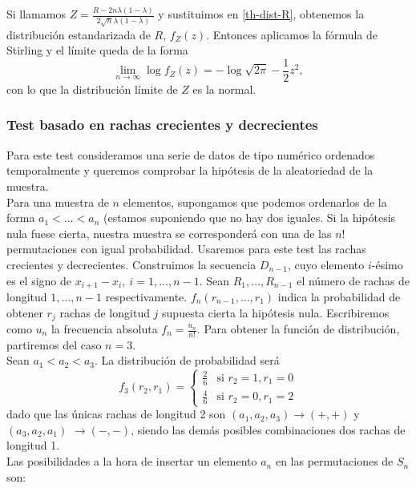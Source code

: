 	Si llamamos $Z = \frac{R - 2n\lambda (1-\lambda)}
{2 \sqrt{n}\lambda (1-\lambda)}$ y sustituimos en 
\ref{th-dist-R}, obtenemos la distribución estandarizada de 
$R$, $f_Z(z)$. Entonces aplicamos la fórmula de Stirling y el 
límite queda de la forma
	\[ \underset{n \rightarrow \infty}{\lim} \log f_Z(z)=
			-\log \sqrt{2\pi} - \frac{1}{2} z^2,	\]
	con lo que la distribución límite de $Z$ es la normal. 
	
	
\subsubsection{Test basado en rachas crecientes y decrecientes}	

	Para este test consideramos una serie de datos de tipo 
numérico ordenados temporalmente y queremos comprobar la 
hipótesis de la aleatoriedad de la muestra.\\
	Para una muestra de $n$ elementos, supongamos que podemos 
ordenarlos de la forma $a_1 < \dots < a_n$ (estamos 
suponiendo que no hay dos iguales. Si la hipótesis nula fuese 
cierta, nuestra muestra se corresponderá con una de las $n!$ 
permutaciones con igual probabilidad. Usaremos para este test 
las rachas crecientes y decrecientes. Construimos la 
secuencia $D_{n-1}$, cuyo elemento $i$-ésimo es el signo de 
$x_{i+1} - x_i,\ i=1, \dots, n-1$. Sean $R_1, \dots, R_{n-1}$ 
el número de rachas de longitud $1, \dots, n-1$ 
respectivamente. $f_n(r_{n-1}, \dots, r_1)$ indica la 
probabilidad de obtener $r_j$ rachas de longitud $j$ supuesta 
cierta la hipótesis nula. Escribiremos como $u_n$ la 
frecuencia absoluta $f_n = \frac{u_n}{n!}$. Para obtener la 
función de distribución, partiremos del caso $n=3$.\\
	Sean $a_1 < a_2 < a_3$. La distribución de probabilidad 
será 
	\[ 
	f_3(r_2, r_1) = 
		\left\lbrace\begin{array}{cc}
			\frac{2}{6} & \text{si } r_2 = 1, r_1 = 0 \\
			\frac{4}{6} & \text{si } r_2 = 0, r_1 = 2 
		\end{array}\right.
	\]
	dado que las únicas rachas de longitud 2 son 
$(a_1, a_2, a_3) \rightarrow (+,+)$ y $(a_3, a_2, a_1)$ 
$\rightarrow (-,-)$, siendo las demás posibles combinaciones 
dos rachas de longitud 1.\\
	Las posibilidades a la hora de insertar un elemento $a_n$ 
en las permutaciones de $S_n$ son:

